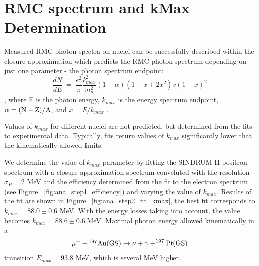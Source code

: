 \newpage
\section {RMC spectrum and kMax Determination}

Measured RMC photon spectra on nuclei can be successfully described within 
the closure approximation which predicts the RMC photon spectrum depending
on just one parameter - the photon spectrum endpoint:
$$
    \frac{dN}{dE} ~=~ \frac{e^2}{\pi} \frac{k_{max}^2}{ m_{\mu}^2} (1 - \alpha) (1-x+2x^2)x(1-x)^2
$$
, where E is the photon energy, $k_{max}$ is the energy spectrum endpoint, $\rm \alpha = (N-Z)/A$,
and $x = E/k_{max}$ \cite{Christillin_1980}.

Values of $k_{max}$ for different nuclei are not predicted, but determined from the fits
to experimental data. Typically, fits return values of $k_{max}$ significantly lower that
the kinematically allowed limits. 

We determine the value of $k_{max}$ parameter by fitting the SINDRUM-II positron spectrum
with a closure approximation spectrum convoluted with the resolution $\sigma_P = 2$ MeV
and the efficiency determined from the fit to the electron spectrum
(see Figure ~\ref{fig:ana_step1_efficiency}) and varying the value of $k_{max}$.
Results of the fit are shown in Figure ~\ref{fig:ana_step2_fit_kmax}, the best fit
corresponds to $k_{max} = 88.0 \pm 0.6$ MeV.
%
With the energy losses taking into account, the value becomes  $k_{max} = 88.6 \pm 0.6$ MeV.
Maximal photon energy allowed kinematically in a 
$$
\rm \mu^- + \mbox{$\rm ^{197}Au$}(GS) \rightarrow \nu +\gamma + ^{197}Pt(GS)
$$
transition $E_{max} = 93.8$ MeV, which is several MeV higher.

